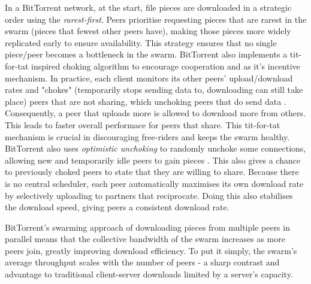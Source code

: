 \documentclass[12pt,a4paper]{report}
\begin{document}
In a BitTorrent network, at the start, file pieces are downloaded in a strategic order using the \textit{rarest-first}. Peers prioritise requesting pieces that are rarest in the swarm (pieces that fewest other peers have), making those pieces more widely replicated early to ensure availability. This strategy ensures that no single piece/peer becomes a bottleneck in the swarm. BitTorrent also implements a tit-for-tat inspired choking algorithm to encourage cooperation and as it's incentive mechanism. In practice, each client monitors its other peers' upload/download rates and "chokes" (temporarily stops sending data to, downloading can still take place) peers that are not sharing, which unchoking peers that do send data \cite{choking}. Consequently, a peer that uploads more is allowed to download more from others. This leads to faster overall performace for peers that share. This tit-for-tat mechanism is crucial in discouraging free-riders and keeps the swarm healthy. BitTorrent also uses \textit{optimistic unchoking} to randomly unchoke some connections, allowing new and temporarily idle peers to gain pieces \cite{choking}. This also gives a chance to previously choked peers to state that they are willing to share. Because there is no central scheduler, each peer automatically maximises its own download rate by selectively uploading to partners that reciprocate. Doing this also stabilises the download speed, giving peers a consistent download rate.

BitTorrent's swarming approach of downloading pieces from multiple peers in parallel means that the collective bandwidth of the swarm increases as more peers join, greatly improving download efficiency. To put it simply, the swarm's average throughput scales with the number of peers - a sharp contrast and advantage to traditional client-server downloads limited by a server's capacity.
\end{document}
